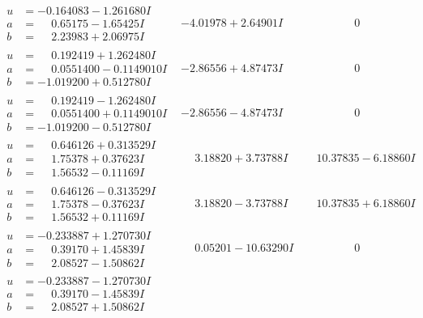 \documentclass[1p]{elsarticle_modified}
\theoremstyle{definition}
\begin{document}
$$\begin{array}{c|c|c}
\begin{aligned}
u &= -0.164083 - 1.261680 I \\
a &= \phantom{-}0.65175 - 1.65425 I \\
b &= \phantom{-}2.23983 + 2.06975 I\end{aligned}
 & -4.01978 + 2.64901 I & \phantom{-0.000000 } 0 \\ \hline\begin{aligned}
u &= \phantom{-}0.192419 + 1.262480 I \\
a &= \phantom{-}0.0551400 - 0.1149010 I \\
b &= -1.019200 + 0.512780 I\end{aligned}
 & -2.86556 + 4.87473 I & \phantom{-0.000000 } 0 \\ \hline\begin{aligned}
u &= \phantom{-}0.192419 - 1.262480 I \\
a &= \phantom{-}0.0551400 + 0.1149010 I \\
b &= -1.019200 - 0.512780 I\end{aligned}
 & -2.86556 - 4.87473 I & \phantom{-0.000000 } 0 \\ \hline\begin{aligned}
u &= \phantom{-}0.646126 + 0.313529 I \\
a &= \phantom{-}1.75378 + 0.37623 I \\
b &= \phantom{-}1.56532 - 0.11169 I\end{aligned}
 & \phantom{-}3.18820 + 3.73788 I & \phantom{-}10.37835 - 6.18860 I \\ \hline\begin{aligned}
u &= \phantom{-}0.646126 - 0.313529 I \\
a &= \phantom{-}1.75378 - 0.37623 I \\
b &= \phantom{-}1.56532 + 0.11169 I\end{aligned}
 & \phantom{-}3.18820 - 3.73788 I & \phantom{-}10.37835 + 6.18860 I \\ \hline\begin{aligned}
u &= -0.233887 + 1.270730 I \\
a &= \phantom{-}0.39170 + 1.45839 I \\
b &= \phantom{-}2.08527 - 1.50862 I\end{aligned}
 & \phantom{-}0.05201 - 10.63290 I & \phantom{-0.000000 } 0 \\ \hline\begin{aligned}
u &= -0.233887 - 1.270730 I \\
a &= \phantom{-}0.39170 - 1.45839 I \\
b &= \phantom{-}2.08527 + 1.50862 I\end{aligned}

\end{array}$$
\end{document}

